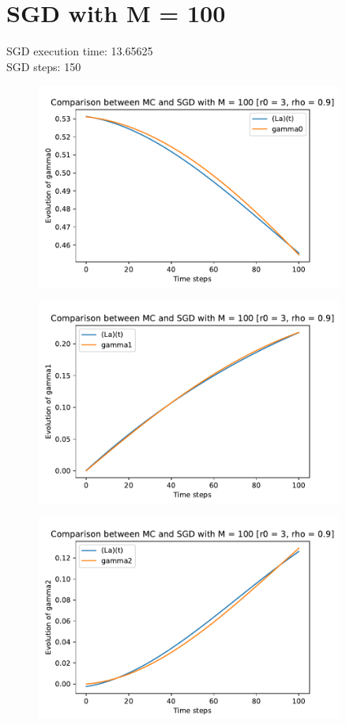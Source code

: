 \documentclass[a4paper,11pt,openright]{report}
\begin{document}
\section{SGD with M = 100}
SGD execution time: 13.65625 \\
SGD steps: 150

\begin{figure}[H]
\centering
\includegraphics[width=0.9\textwidth]{gamma0 SGD 100.pdf}
\end{figure}
\begin{figure}[H]
\centering
\includegraphics[width=0.9\textwidth]{gamma1 SGD 100.pdf}
\end{figure}
\begin{figure}[H]
\centering
\includegraphics[width=0.9\textwidth]{gamma2 SGD 100.pdf}
\end{figure}
\end{document}
